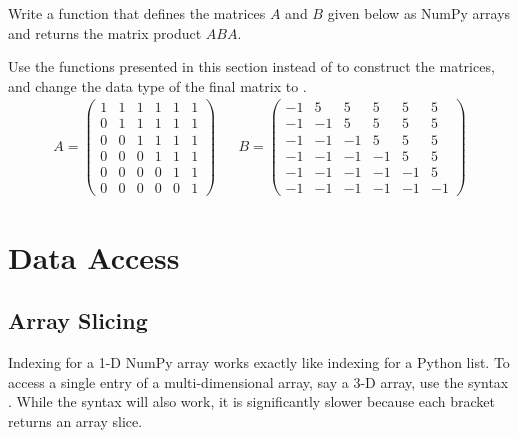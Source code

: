 \begin{problem} %
Write a function that defines the matrices $A$ and $B$ given below as NumPy arrays and returns the matrix product $ABA$.

Use the functions presented in this section instead of  to construct the matrices, and change the data type of the final matrix to .
\begin{align*}
A = \left(\begin{array}{rrrrrr}
1 & 1 & 1 & 1 & 1 & 1\\
0 & 1 & 1 & 1 & 1 & 1\\
0 & 0 & 1 & 1 & 1 & 1\\
0 & 0 & 0 & 1 & 1 & 1\\
0 & 0 & 0 & 0 & 1 & 1\\
0 & 0 & 0 & 0 & 0 & 1\end{array}\right)
&&
B = \left(\begin{array}{rrrrrr}
-1 &  5 &  5 &  5 &  5 &  5\\
-1 & -1 &  5 &  5 &  5 &  5\\
-1 & -1 & -1 &  5 &  5 &  5\\
-1 & -1 & -1 & -1 &  5 &  5\\
-1 & -1 & -1 & -1 & -1 &  5\\
-1 & -1 & -1 & -1 & -1 & -1\end{array}\right)
\end{align*}
\label{prob:simple3}
\end{problem}

\section*{Data Access} %

\subsection*{Array Slicing} %

Indexing for a 1-D NumPy array works exactly like indexing for a Python list. 
To access a single entry of a multi-dimensional array, say a 3-D array, use the syntax .
While the syntax  will also work, it is significantly slower because each bracket returns an array slice.

